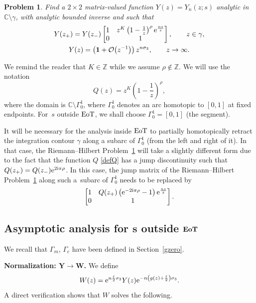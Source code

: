 \documentclass[pdftex]{sigma}
\numberwithin{equation}{section}
\newtheorem{problem}[Theorem]{Problem}
\theoremstyle{definition}
\def\le{\left}
\def\ri{\right}
\def\be{\begin{equation}}
\def\ee{\end{equation}}
\def \1{\mathbf 1}
\def\C{{\mathbb C}}
\def\Z{{\mathbb Z}}
\def\s{\sigma}
\begin{document}
\begin{problem}
\label{RHPY1} Find a $2\times 2$ matrix-valued function $Y(z) = Y_n(z;s)$ analytic in $\C \setminus \gamma$, with analytic bounded inverse and such that
\begin{gather*}
Y(z_+) = Y(z_-) \begin{bmatrix}
1 & z^{{ {K}}}\le(1-\frac 1 z\ri)^{ {\rho}} {\rm e}^{\frac {ns}z}\\
0 & 1
\end{bmatrix}, \qquad z\in \gamma,
\\
Y(z) = \le(\1 + \mathcal O\bigl(z^{-1}\bigr)\ri) z^{n\s_3}, \qquad z\to \infty.
\end{gather*}
\end{problem}
We remind the reader that ${ {K}} \in \Z$ while we assume ${ {\rho}} \not\in \Z$.
We will use the notation
\be
\label{defQ}
Q(z) = z^{ {K}}\le(1 - \frac 1 z \ri)^{ {\rho}},
\ee
where the domain is $\C\setminus \Gamma_0^1$, where $\Gamma_0^1$ denotes an arc homotopic to $[0,1]$ at fixed endpoints. For~$s$ outside ${\rm EoT}$, we shall choose $\Gamma_0^1=[0,1]$ (the segment).

It will be necessary for the analysis inside ${\rm EoT}$ to partially homotopically retract the integration contour $\gamma$ along a subarc of $\Gamma_0^1$ (from the left and right of it). In that case, the Riemann--Hilbert Problem~\ref{RHPY1} will take a slightly different form due to the fact that the function $Q$ \eqref{defQ} has a jump discontinuity such that $Q(z_+) = Q(z_-) {\rm e}^{2{\rm i}\pi \rho}$. In this case, the jump matrix of the Riemann--Hilbert Problem~\ref{RHPY1} along such a~subarc of $\Gamma_0^1$ needs to be replaced by
\[
 \begin{bmatrix}
1 & Q(z_+) \le({\rm e}^{-2{\rm i}\pi \rho} - 1\ri) {\rm e}^{\frac {ns}z}\\
0 & 1
\end{bmatrix}.
\]

\subsection[Asymptotic analysis for $s$ outside EoT]{Asymptotic analysis for $\boldsymbol{s}$ outside $\boldsymbol{{\rm EoT}}$}
\label{outsideEoT}

We recall that $\Gamma_m$, $\Gamma_c$ have been defined in Section~\ref{gzero}.

{\bf Normalization: $\boldsymbol{Y\to W}$.}
We define
\be
\label{defW}
W(z)= {\rm e}^{n\frac \ell 2 \s_3} Y(z) {\rm e}^{ -n\le(g(z) + \frac \ell 2\ri)\s_3}.
\ee
A direct verification shows that $W$ solves the following.
\end{document}

